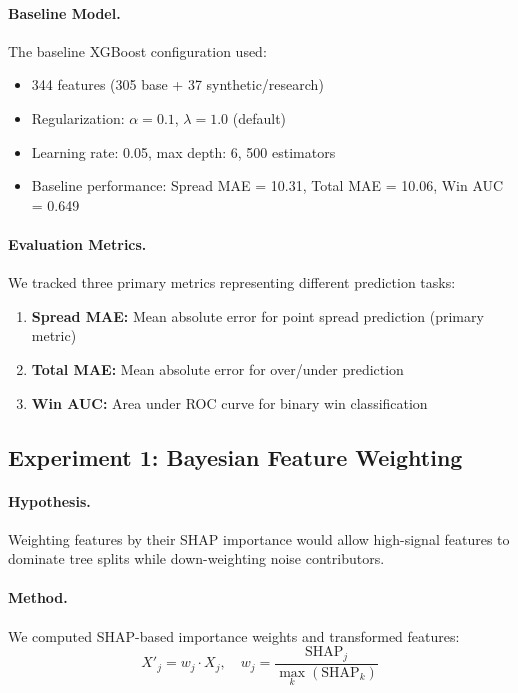 \paragraph{Baseline Model.}
The baseline XGBoost configuration used:
\begin{itemize}[itemsep=2pt,parsep=0pt]
    \item 344 features (305 base + 37 synthetic/research)
    \item Regularization: $\alpha = 0.1$, $\lambda = 1.0$ (default)
    \item Learning rate: 0.05, max depth: 6, 500 estimators
    \item Baseline performance: Spread MAE = 10.31, Total MAE = 10.06, Win AUC = 0.649
\end{itemize}

\paragraph{Evaluation Metrics.}
We tracked three primary metrics representing different prediction tasks:
\begin{enumerate}[itemsep=2pt,parsep=0pt]
    \item \textbf{Spread MAE:} Mean absolute error for point spread prediction (primary metric)
    \item \textbf{Total MAE:} Mean absolute error for over/under prediction
    \item \textbf{Win AUC:} Area under ROC curve for binary win classification
\end{enumerate}

\subsection{Experiment 1: Bayesian Feature Weighting}

\paragraph{Hypothesis.}
Weighting features by their SHAP importance would allow high-signal features to dominate tree splits while down-weighting noise contributors.

\paragraph{Method.}
We computed SHAP-based importance weights and transformed features:
\begin{equation}
    X'_j = w_j \cdot X_j, \quad w_j = \frac{\text{SHAP}_j}{\max_k(\text{SHAP}_k)}
\end{equation}

